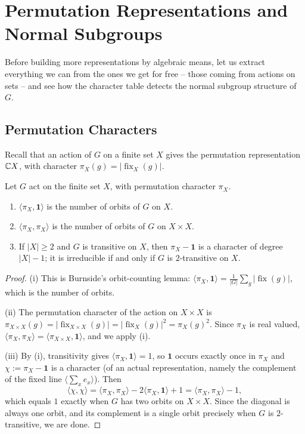 \documentclass[a4paper]{scrartcl}
\newcommand{\ip}[2]{\langle #1, #2 \rangle}
\newcommand{\gen}[1]{\langle #1 \rangle}
\begin{document}
\section{Permutation Representations and Normal Subgroups}

Before building more representations by algebraic means, let us extract everything we can from the ones we get for free -- those coming from actions on sets -- and see how the character table detects the normal subgroup structure of $G$.

\subsection{Permutation Characters}

Recall that an action of $G$ on a finite set $X$ gives the permutation representation $\mathbb{C} X$, with character $\pi_X(g) = |\operatorname{fix}_X(g)|$.

\begin{proposition}
	Let $G$ act on the finite set $X$, with permutation character $\pi_X$.
	\begin{enumerate}[label=(\roman*)]
		\item $\ip{\pi_X}{\mathbf 1}$ is the number of orbits of $G$ on $X$.
		\item $\ip{\pi_X}{\pi_X}$ is the number of orbits of $G$ on $X\times X$.
		\item If $|X| \geq 2$ and $G$ is transitive on $X$, then $\pi_X - \mathbf 1$ is a character of degree $|X|-1$; it is irreducible if and only if $G$ is $2$-transitive on $X$.
	\end{enumerate}
\end{proposition}
\begin{proof}
	(i) This is Burnside's orbit-counting lemma: $\ip{\pi_X}{\mathbf 1} = \frac1{|G|}\sum_g|\operatorname{fix}(g)|$, which is the number of orbits.

	(ii) The permutation character of the action on $X \times X$ is $\pi_{X\times X}(g) = |\operatorname{fix}_{X\times X}(g)| = |\operatorname{fix}_X(g)|^2 = \pi_X(g)^2$. Since $\pi_X$ is real valued, $\ip{\pi_X}{\pi_X} = \ip{\pi_{X\times X}}{\mathbf 1}$, and we apply (i).

	(iii) By (i), transitivity gives $\ip{\pi_X}{\mathbf 1} = 1$, so $\mathbf 1$ occurs exactly once in $\pi_X$ and $\chi := \pi_X - \mathbf 1$ is a character (of an actual representation, namely the complement of the fixed line $\gen{\sum_x e_x}$). Then
	$$\ip{\chi}{\chi} = \ip{\pi_X}{\pi_X} - 2\ip{\pi_X}{\mathbf 1} + 1 = \ip{\pi_X}{\pi_X} - 1,$$
	which equals $1$ exactly when $G$ has two orbits on $X\times X$. Since the diagonal is always one orbit, and its complement is a single orbit precisely when $G$ is $2$-transitive, we are done.
\end{proof}
\end{document}
